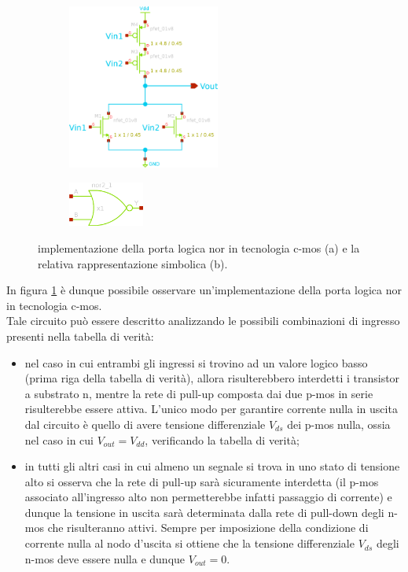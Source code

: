 	\begin{figure}[bht]
		\centering
		\begin{subfigure}{0.48\linewidth}
			\centering
			\includegraphics[width=5cm]{Immagini/nor-gate.eps} \caption{}			
		\end{subfigure}
		\begin{subfigure}{0.48\linewidth}
			\centering
			\includegraphics[width=2.5cm]{Immagini/nor-gate-simple.eps} \caption{}			
		\end{subfigure}
		\caption{implementazione della porta logica nor in tecnologia c-mos (a) e la relativa rappresentazione simbolica (b).}
		\label{fig:nor:schematico}
	\end{figure}

	In figura \ref{fig:nor:schematico} è dunque possibile osservare un'implementazione della porta logica nor in tecnologia c-mos.\\
	Tale circuito può essere descritto analizzando le possibili combinazioni di ingresso presenti nella tabella di verità:
	\begin{itemize}
		\item nel caso in cui entrambi gli ingressi si trovino ad un valore logico basso (prima riga della tabella di verità), allora risulterebbero interdetti i transistor a substrato n, mentre la rete di pull-up composta dai due p-mos in serie risulterebbe essere attiva. L'unico modo per garantire corrente nulla in uscita dal circuito è quello di avere tensione differenziale $V_{ds}$ dei p-mos nulla, ossia nel caso in cui $V_{out} = V_{dd}$, verificando la tabella di verità;
		
		\item in tutti gli altri casi in cui almeno un segnale si trova in uno stato di tensione alto si osserva che la rete di pull-up sarà sicuramente interdetta (il p-mos associato all'ingresso alto non permetterebbe infatti passaggio di corrente) e dunque la tensione in uscita sarà determinata dalla rete di pull-down degli n-mos che risulteranno attivi. Sempre per imposizione della condizione di corrente nulla al nodo d'uscita si ottiene che la tensione differenziale $V_{ds}$ degli n-mos deve essere nulla e dunque $V_{out} = 0$.
	\end{itemize}
	
